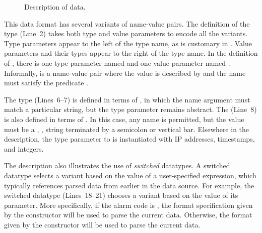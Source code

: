 \begin{figure}
  \centering
  
  \caption{Description of \darkstar{} data.}
  \label{fig:darkstar-ml}
\end{figure}

This data format has several variants of name-value pairs.  The
definition of the type  (Line~2) takes both type and value
parameters to encode all the variants.  Type parameters appear to the
left of the type name, as is customary in \ml{}.  Value parameters and
their \ml{} types appear to the right of the type name.  In the
definition of , there is one type parameter named 
and one value parameter named .  Informally, 
is a name-value pair where the value is described by  and
the name must satisfy the predicate .

The  type (Lines~6--7) is defined in terms of , in
which the name argument must match a particular string, but the type
parameter remains abstract.  The  (Line~8) is also defined
in terms of .  In this case, any name is permitted, but the
value must be a , \ie{}, string terminated by a semicolon
or vertical bar.  Elsewhere in the description, the type parameter to
 is instantiated with IP addresses, timestamps, and integers.


The \darkstar{} description also illustrates the use of
\textit{switched} datatypes.  A switched datatype selects a variant
based on the value of a user-specified \ocaml{} expression, which
typically references parsed data from earlier in the data source.  For
example, the switched datatype  (Lines~18--21) chooses a
variant based on the value of its  parameter.  More
specifically, if the alarm code is , the format specification
given by the  constructor will be used to parse the
current data.  Otherwise, the format given by the 
constructor will be used to parse the current data.

